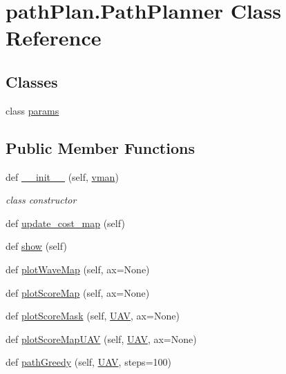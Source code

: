 \hypertarget{classpath_plan_1_1_path_planner}{}\section{path\+Plan.\+Path\+Planner Class Reference}
\label{classpath_plan_1_1_path_planner}
\subsection*{Classes}
\begin{DoxyCompactItemize}
\item 
class \mbox{\hyperlink{classpath_plan_1_1_path_planner_1_1params}{params}}
\end{DoxyCompactItemize}
\subsection*{Public Member Functions}
\begin{DoxyCompactItemize}
\item 
def \mbox{\hyperlink{classpath_plan_1_1_path_planner_a4725d91c2d54372bbfecfce0a71a3552}{\+\_\+\+\_\+init\+\_\+\+\_\+}} (self, \mbox{\hyperlink{classpath_plan_1_1_path_planner_a8e31f83f0d8983286bb3746da568af81}{vman}})
\begin{DoxyCompactList}\small\item\em class constructor \end{DoxyCompactList}\item 
def \mbox{\hyperlink{classpath_plan_1_1_path_planner_a3ec1a61977be524a6d7099f4e4cd83b1}{update\+\_\+cost\+\_\+map}} (self)
\item 
def \mbox{\hyperlink{classpath_plan_1_1_path_planner_ac2b91da25e1f81aa210e83d502f9a008}{show}} (self)
\item 
def \mbox{\hyperlink{classpath_plan_1_1_path_planner_ad0aac3259a17970adbb7652d32365f44}{plot\+Wave\+Map}} (self, ax=None)
\item 
def \mbox{\hyperlink{classpath_plan_1_1_path_planner_abe0f6150b91e41dc9625d29a7005e37d}{plot\+Score\+Map}} (self, ax=None)
\item 
def \mbox{\hyperlink{classpath_plan_1_1_path_planner_a6e74d35801d637631580333ea9210aa5}{plot\+Score\+Mask}} (self, \mbox{\hyperlink{classpath_plan_1_1_u_a_v}{U\+AV}}, ax=None)
\item 
def \mbox{\hyperlink{classpath_plan_1_1_path_planner_aa5506bc585bd5f1d3fa76d0e383b0cc2}{plot\+Score\+Map\+U\+AV}} (self, \mbox{\hyperlink{classpath_plan_1_1_u_a_v}{U\+AV}}, ax=None)
\item 
def \mbox{\hyperlink{classpath_plan_1_1_path_planner_aced5344f393f49830c28225b435fe0c2}{path\+Greedy}} (self, \mbox{\hyperlink{classpath_plan_1_1_u_a_v}{U\+AV}}, steps=100)
\end{DoxyCompactItemize}
